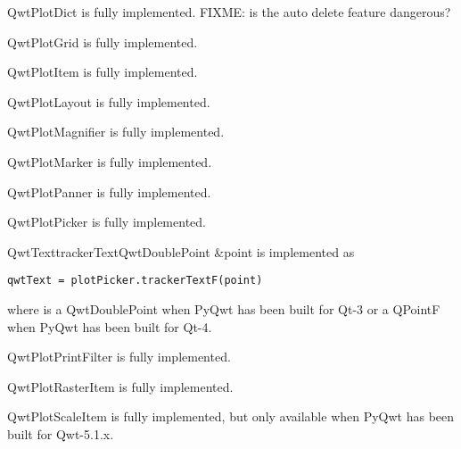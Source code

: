 \documentclass{manual}
\begin{document}
{\begin{classdesc*}{QwtPlotDict}
  is fully implemented.
  FIXME: is the auto delete feature dangerous?
\end{classdesc*}

\begin{classdesc*}{QwtPlotGrid}
  is fully implemented.
\end{classdesc*}

\begin{classdesc*}{QwtPlotItem}
  is fully implemented.
\end{classdesc*}

\begin{classdesc*}{QwtPlotLayout}
  is fully implemented.
\end{classdesc*}

\begin{classdesc*}{QwtPlotMagnifier}
  is fully implemented.
\end{classdesc*}

\begin{classdesc*}{QwtPlotMarker}
  is fully implemented.
\end{classdesc*}

\begin{classdesc*}{QwtPlotPanner}
  is fully implemented.
\end{classdesc*}

\begin{classdesc*}{QwtPlotPicker}
  is fully implemented.

  \begin{cfuncdesc}{QwtText}{trackerText}{QwtDoublePoint \&point}
    is implemented as
    \begin{verbatim}
qwtText = plotPicker.trackerTextF(point)
    \end{verbatim}
    where  is a QwtDoublePoint when PyQwt has been built for Qt-3 or
    a QPointF when PyQwt has been built for Qt-4.
  \end{cfuncdesc}

\end{classdesc*}

\begin{classdesc*}{QwtPlotPrintFilter}
  is fully implemented.
\end{classdesc*}

\begin{classdesc*}{QwtPlotRasterItem}
  is fully implemented.
\end{classdesc*}

\begin{classdesc*}{QwtPlotScaleItem}
  is fully implemented, but only available when PyQwt has been built for
  Qwt-5.1.x. 
\end{classdesc*}

}
\end{document}
